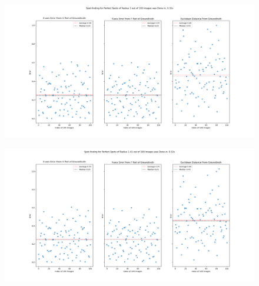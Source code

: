 \documentclass[aps,pra,a4paper,nofootinbib,onecolumn,tightenlines,longbibliography,12pt,amsfonts,amssymb,amsmath,floatfix]{revtex4-2} %
\begin{document}

\begin{figure}[H]
      \begin{center}
        \includegraphics[width=1.0\textwidth]{project_pics/error_r1.png}
      \end{center}
      \caption{}
      \label{fig:tri_er_r1}
    \end{figure}
    
    \begin{figure}[H]
      \begin{center}
        \includegraphics[width=1.0\textwidth]{project_pics/error_r141.png}
      \end{center}
      \caption{}
      \label{fig:tri_er_r141}
    \end{figure}
    
\end{document}
